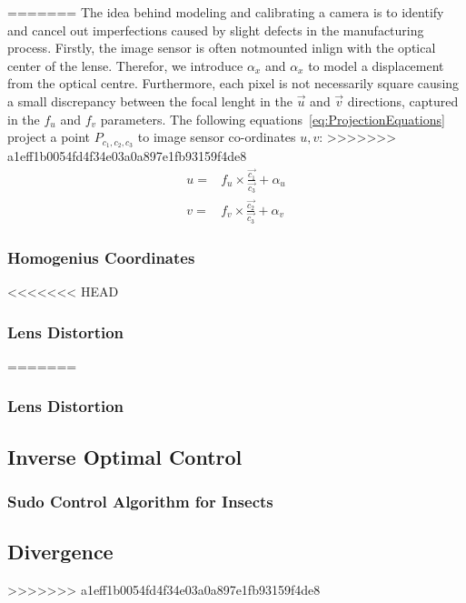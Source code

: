 \documentclass{UoNMCHA}
\numberwithin{equation}{section}
\begin{document}
=======
The idea behind modeling and calibrating a camera is to identify and cancel out imperfections caused by slight defects in the manufacturing process. Firstly, the image sensor is often notmounted inlign with the optical center of the lense. Therefor, we introduce $\alpha_{x}$ and $\alpha_{x}$ to model a displacement from the optical centre. Furthermore, each pixel is not necessarily square causing a small discrepancy between the focal lenght in the $\vec{u}$ and $\vec{v}$ directions, captured in the $f_{u}$ and $f_{v}$ parameters. The following equations~\ref{eq:ProjectionEquations} project a point $P_{c_{1}, c_{2}, c_{3}}$ to image sensor co-ordinates $u, v$:
>>>>>>> a1eff1b0054fd4f34e03a0a897e1fb93159f4de8
\begin{equation*}\label{eq:ProjectionEquations}
	\begin{split}
		u = &f_{u} \times \frac{\vec{c_{1}}}{\vec{c_{3}}} + \alpha_{u}\\
		v = &f_{v} \times \frac{\vec{c_{2}}}{\vec{c_{3}}} + \alpha_{v}
	\end{split}
\end{equation*}
\subsubsection{Homogenius Coordinates}
<<<<<<< HEAD

\subsubsection{Lens Distortion}
=======

\subsubsection{Lens Distortion}

\subsection{Inverse Optimal Control} %
\subsubsection{Sudo Control Algorithm for Insects}
\subsubsection{}
\subsection{Divergence}
>>>>>>> a1eff1b0054fd4f34e03a0a897e1fb93159f4de8
 
\end{document}
